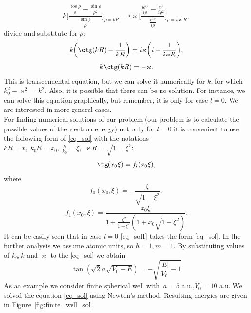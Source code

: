 \documentclass[a4paper, 12pt]{article}
\begin{document}
$$k \bigg[ \frac{\frac{\cos \rho}{\rho} - \frac{\sin \rho}{\rho^2}}{\frac{\sin \rho}{\rho}} \bigg]_{\rho = kR} = i \varkappa \bigg[ \frac{\frac{i e^{i \rho}}{i \rho} - \frac{e^{i \rho}}{i \rho^2}}{\frac{e^{i \rho}}{i \rho}} \bigg]_{\rho = i \varkappa R},
$$
divide and substitute for  $\rho$:
$$k \bigg(\ctg(kR)-\frac{1}{kR}\bigg) = i \varkappa \bigg( i - \frac{1}{i \varkappa R} \bigg),$$
\begin{equation}\label{eq_sol}
	k \ctg(kR) = - \varkappa.
\end{equation}
This is transcendental equation, but we can solve it numerically for  $k$,  for which $k_0^2-\varkappa^2=k^2.$ Also, it is possible that there can be no solution. For instance, we can solve this equation graphically, but remember, it is only for case $l=0.$ We are interested in more general cases.\\
For finding numerical solutions of our problem (our problem is to calculate the possible values of the electron energy) not only for $l=0$ it is convenient to use the following form of \eqref{eq_sol} with the notations $kR = x, ~k_0 R=x_0, ~\frac{k}{k_0} = \xi, ~\varkappa R = \sqrt{1=\xi^2}$:
\begin{equation}\label{eq_sol1}
	\tg(x_0 \xi) = f_l(x_0 \xi),
\end{equation}
where
$$f_0(x_0, \xi) = -\frac{\xi}{\sqrt{1-\xi^2}},$$
$$f_1(x_0, \xi) = \frac{x_0 \xi}{1+\frac{\xi^2}{1-\xi^2}(1+x_0 \sqrt{1-\xi^2})}.$$ 
It can be easily seen that in case $l=0$ \eqref{eq_sol1} takes the form \eqref{eq_sol}. In the further analysis we assume atomic units, so $\hbar = 1, m=1.$ By substituting values of $k_0, k$ and $\varkappa$ to the \eqref{eq_sol} we obtain:
$$\tan(\sqrt{2} a \sqrt{V_0-E})=-\sqrt{\frac{|E|}{V_0}-1}$$ 
As an example we consider finite spherical well with $\ a = 5 $ a.u.,$ V_0 = 10$ a.u. We solved the equation \eqref{eq_sol} using Newton's method. Resulting energies are given in Figure~\ref{fig:finite_well_sol}.
\end{document}
